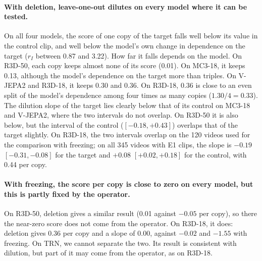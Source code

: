 \paragraph{With deletion, leave-one-out dilutes on every model where it can be tested.}
On all four models, the score of one copy of the target falls well below its value in the control clip, and well below the model's own change in dependence on the target ($r_I$ between 0.87 and 3.22).
How far it falls depends on the model.
On R3D-50, each copy keeps almost none of its score (0.01).
On MC3-18, it keeps 0.13, although the model's dependence on the target more than triples.
On V-JEPA2 and R3D-18, it keeps 0.30 and 0.36.
On R3D-18, 0.36 is close to an even split of the model's dependence among four times as many copies ($1.30 / 4 = 0.33$).
The dilution slope of the target lies clearly below that of its control on MC3-18 and V-JEPA2, where the two intervals do not overlap.
On R3D-50 it is also below, but the interval of the control ($[-0.18, +0.43]$) overlaps that of the target slightly.
On R3D-18, the two intervals overlap on the 120 videos used for the comparison with freezing; on all 345 videos with E1 clips, the slope is $-0.19$ $[-0.31, -0.08]$ for the target and $+0.08$ $[+0.02, +0.18]$ for the control, with 0.44 per copy.

\paragraph{With freezing, the score per copy is close to zero on every model, but this is partly fixed by the operator.}
On R3D-50, deletion gives a similar result (0.01 against $-0.05$ per copy), so there the near-zero score does not come from the operator.
On R3D-18, it does: deletion gives 0.36 per copy and a slope of 0.00, against $-0.02$ and $-1.55$ with freezing.
On TRN, we cannot separate the two.
Its result is consistent with dilution, but part of it may come from the operator, as on R3D-18.


